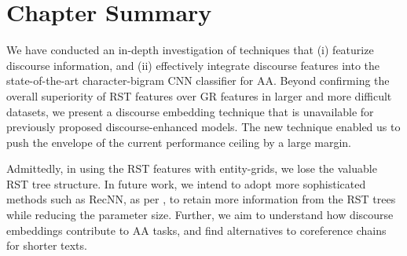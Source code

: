 \section{Chapter Summary}
\label{sec:conclusion}
We have conducted an in-depth investigation of techniques that (i) featurize discourse information, and (ii) effectively integrate discourse features into the state-of-the-art character-bigram CNN classifier for AA. 
Beyond confirming the overall superiority of RST features over GR features in larger and more difficult datasets, we present a discourse embedding technique that is unavailable for previously proposed discourse-enhanced models.
The new technique enabled us to push the envelope of the current performance ceiling by a large margin. 

Admittedly, in using the RST features with entity-grids, we lose the valuable RST tree structure.
In future work, we intend to adopt more sophisticated methods such as RecNN, as per , to retain more information from the RST trees while reducing the parameter size. Further, we aim to understand how discourse embeddings contribute to AA tasks, and find alternatives to coreference chains for shorter texts.